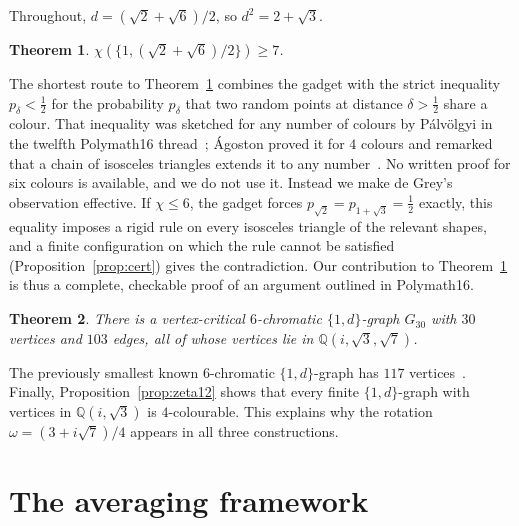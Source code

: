 \documentclass[11pt,a4paper]{amsart}
\newtheorem{theorem}{Theorem}
\theoremstyle{remark}
\newcommand{\Q}{\mathbb{Q}}
\begin{document}
Throughout, $d=(\sqrt2+\sqrt6)/2$, so $d^2=2+\sqrt3$.

\begin{theorem}\label{thm:seven}
$\chi(\{1,(\sqrt2+\sqrt6)/2\})\ge7$.
\end{theorem}

The shortest route to Theorem~\ref{thm:seven} combines the gadget with the strict inequality $p_\delta<\tfrac12$ for the probability $p_\delta$ that two random points at distance $\delta>\tfrac12$ share a colour. That inequality was sketched for any number of colours by P\'alv\"olgyi in the twelfth Polymath16 thread~\cite{PM12}; \'Agoston proved it for $4$ colours and remarked that a chain of isosceles triangles extends it to any number~\cite[Prop.~4.2.6, Rem.~4.2.7]{Ag21}. No written proof for six colours is available, and we do not use it. Instead we make de Grey's observation effective. If $\chi\le6$, the gadget forces $p_{\sqrt2}=p_{1+\sqrt3}=\tfrac12$ exactly, this equality imposes a rigid rule on every isosceles triangle of the relevant shapes, and a finite configuration on which the rule cannot be satisfied (Proposition~\ref{prop:cert}) gives the contradiction. Our contribution to Theorem~\ref{thm:seven} is thus a complete, checkable proof of an argument outlined in Polymath16.

\begin{theorem}\label{thm:g30}
There is a vertex-critical $6$-chromatic $\{1,d\}$-graph $G_{30}$ with $30$ vertices and $103$ edges, all of whose vertices lie in $\Q(i,\sqrt3,\sqrt7)$.
\end{theorem}

The previously smallest known $6$-chromatic $\{1,d\}$-graph has $117$ vertices~\cite{DN25}. Finally, Proposition~\ref{prop:zeta12} shows that every finite $\{1,d\}$-graph with vertices in $\Q(i,\sqrt3)$ is $4$-colourable. This explains why the rotation $\omega=(3+i\sqrt7)/4$ appears in all three constructions.

\section{The averaging framework}\label{sec:avg}
\end{document}
